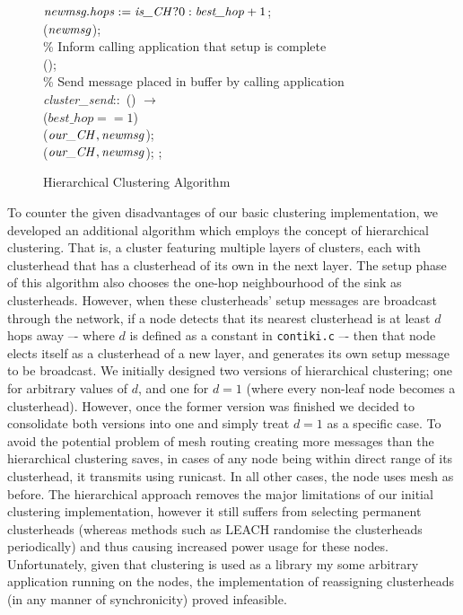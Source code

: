 \begin{figure}[H]
\begin{boxedminipage}{\linewidth}
    \null\qq\qq $\mbox{\emph{newmsg.hops}} \mathrel{:=} \mbox{\emph{is\_CH}} ? 0 : \mbox{\emph{best\_hop}}+1$;\\
    \null\qq\qq {}($\mbox{\emph{newmsg}}$);\\
    \null\qq\qq \% Inform calling application that setup is complete\\
    \null\qq\qq {}();\\
    \null\qq \% Send message placed in buffer by calling application\\
	\null\qq \emph{cluster\_send}::~() $\rightarrow$\\
    \null\qq\qq {} ($best\_hop == 1$)  \\
    \null\qq\qq\qq {}($\mbox{\emph{our\_CH}}, \mbox{\emph{newmsg}}$);
    \null\qq\qq {}\\    
    \null\qq\qq\qq {}($\mbox{\emph{our\_CH}}, \mbox{\emph{newmsg}}$);
    \null\qq\qq {}; \\
  \end{boxedminipage}
  \caption{Hierarchical Clustering Algorithm}
\end{figure}

To counter the given disadvantages of our basic clustering implementation, we developed an additional algorithm which employs the concept of hierarchical clustering. That is, a cluster featuring multiple layers of clusters, each with  clusterhead that has a clusterhead of its own in the next layer. The setup phase of this algorithm also chooses the one-hop neighbourhood of the sink as clusterheads. However, when these clusterheads' setup messages are broadcast through the network, if a node detects that its nearest clusterhead is at least $d$ hops away –- where $d$ is defined as a constant in \verb|contiki.c| –- then that node elects itself as a clusterhead of a new layer, and generates its own setup message to be broadcast. We initially designed two versions of hierarchical clustering; one for arbitrary values of $d$, and one for $d=1$ (where every non-leaf node becomes a clusterhead). However, once the former version was finished we decided to consolidate both versions into one and simply treat $d=1$ as a specific case. To avoid the potential problem of mesh routing creating more messages than the hierarchical clustering saves, in cases of any node being within direct range of its clusterhead, it transmits using runicast. In all other cases, the node uses mesh as before. The hierarchical approach removes the major limitations of our initial clustering implementation, however it still suffers from selecting permanent clusterheads (whereas methods such as LEACH randomise the clusterheads periodically) and thus causing increased power usage for these nodes. Unfortunately, given that clustering is used as a library my some arbitrary application running on the nodes, the implementation of reassigning clusterheads (in any manner of synchronicity) proved infeasible.


